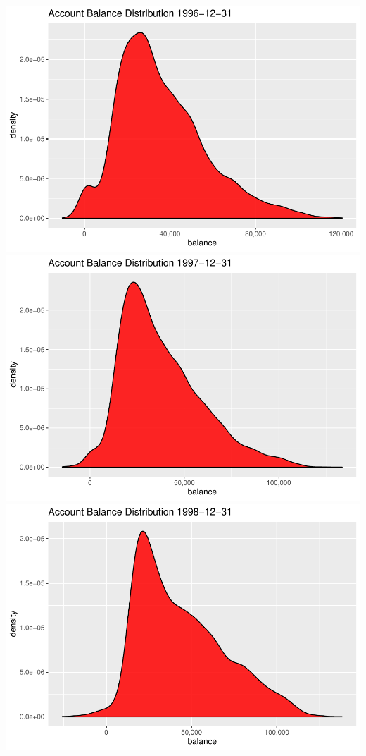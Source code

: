 \documentclass[]{article}
\begin{document}
\includegraphics{analysis_gehrig_files/figure-latex/unnamed-chunk-10-4.pdf}
\includegraphics{analysis_gehrig_files/figure-latex/unnamed-chunk-10-5.pdf}
\includegraphics{analysis_gehrig_files/figure-latex/unnamed-chunk-10-6.pdf}
\end{document}
